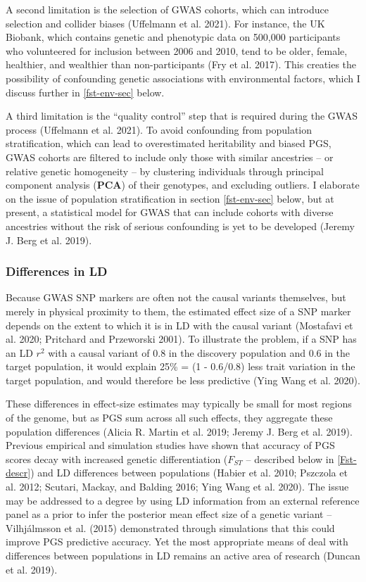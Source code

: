 \documentclass[
]{book}
\begin{document}
A second limitation is the selection of GWAS cohorts, which can introduce selection and collider biases (Uffelmann et al. 2021). For instance, the UK Biobank, which contains genetic and phenotypic data on 500,000 participants who volunteered for inclusion between 2006 and 2010, tend to be older, female, healthier, and wealthier than non-participants (Fry et al. 2017). This creaties the possibility of confounding genetic associations with environmental factors, which I discuss further in \ref{fst-env-sec} below.

A third limitation is the ``quality control'' step that is required during the GWAS process (Uffelmann et al. 2021). To avoid confounding from population stratification, which can lead to overestimated heritability and biased PGS, GWAS cohorts are filtered to include only those with similar ancestries -- or relative genetic homogeneity -- by clustering individuals through principal component analysis (\textbf{PCA}) of their genotypes, and excluding outliers. I elaborate on the issue of population stratification in section \ref{fst-env-sec} below, but at present, a statistical model for GWAS that can include cohorts with diverse ancestries without the risk of serious confounding is yet to be developed (Jeremy J. Berg et al. 2019).

\hypertarget{differences-in-ld-1}{%
\subsubsection{Differences in LD}\label{differences-in-ld-1}}

Because GWAS SNP markers are often not the causal variants themselves, but merely in physical proximity to them, the estimated effect size of a SNP marker depends on the extent to which it is in LD with the causal variant (Mostafavi et al. 2020; Pritchard and Przeworski 2001). To illustrate the problem, if a SNP has an LD \(r^2\) with a causal variant of 0.8 in the discovery population and 0.6 in the target population, it would explain 25\% = (1 - 0.6/0.8) less trait variation in the target population, and would therefore be less predictive (Ying Wang et al. 2020).

These differences in effect-size estimates may typically be small for most regions of the genome, but as PGS sum across all such effects, they aggregate these population differences (Alicia R. Martin et al. 2019; Jeremy J. Berg et al. 2019). Previous empirical and simulation studies have shown that accuracy of PGS scores decay with increased genetic differentiation (\(F_{ST}\) -- described below in \ref{Fst-descr}) and LD differences between populations (Habier et al. 2010; Pszczola et al. 2012; Scutari, Mackay, and Balding 2016; Ying Wang et al. 2020). The issue may be addressed to a degree by using LD information from an external reference panel as a prior to infer the posterior mean effect size of a genetic variant -- Vilhjálmsson et al. (2015) demonstrated through simulations that this could improve PGS predictive accuracy. Yet the most appropriate means of deal with differences between populations in LD remains an active area of research (Duncan et al. 2019).
\end{document}

